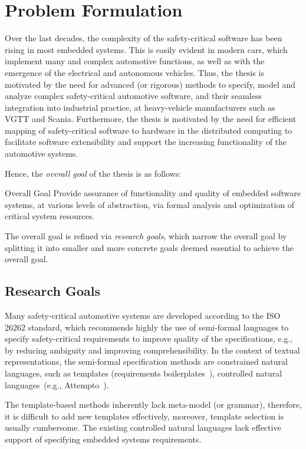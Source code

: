 \chapter{Problem Formulation}\label{ch_problem_formulation}
Over the last decades, the complexity of the safety-critical software has been rising in most embedded systems. This is easily evident in modern cars, which implement many and complex automotive functions, as well as with the emergence of the electrical and autonomous vehicles. Thus, the thesis is motivated by the need for advanced (or rigorous) methods to specify, model and analyze complex safety-critical automotive software, and their seamless integration into industrial practice, at heavy-vehicle manufacturers such as VGTT and Scania. Furthermore, the thesis is motivated by the need for efficient mapping of safety-critical software to hardware in the distributed computing to facilitate software extensibility and support the increasing functionality of the automotive systems. 

Hence, the \textit{overall goal} of the thesis is as follows:
\begin{mybox}[attach title to upper={\ ---\ }]{Overall Goal}
	Provide assurance of functionality and quality of embedded software systems, at various levels of abstraction, via formal analysis and optimization of critical system resources.
\end{mybox}

The overall goal is refined via \textit{research goals}, which narrow the overall goal by splitting it into smaller and more concrete goals deemed essential to achieve the overall goal. 

\section{Research Goals}\label{research_challenges}
Many safety-critical automotive systems are developed according to the ISO 26262 standard, which recommends highly the use of semi-formal languages to specify safety-critical requirements to improve quality of the specifications, e.g., by reducing ambiguity and improving comprehensibility. In the context of textual representations, the semi-formal specification methods are constrained natural languages, such as templates (requirements boilerplates~\cite{Farfeleder2011DODT:Development}\cite{Mahmud2015ReSA:Systems}), controlled natural languages~\cite{Kuhn2014ALanguages}(e.g., Attempto~\cite{attempto96}).

The template-based methods inherently lack meta-model (or grammar), therefore, it is difficult to add new templates effectively, moreover, template selection is usually cumbersome. The existing controlled natural languages lack effective support of specifying embedded systems requirements.

